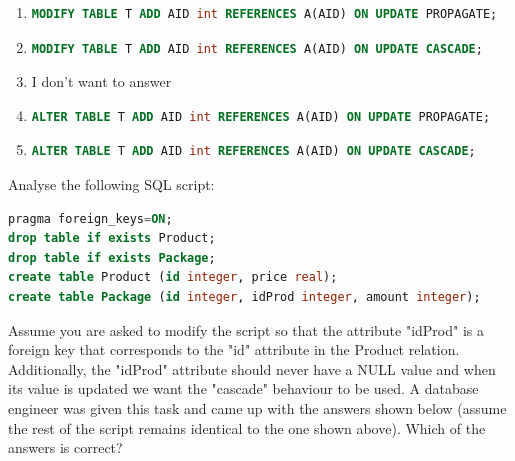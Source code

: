 \documentclass{bdad}
\begin{document}
\begin{enumerate}
    \item
    \begin{lstlisting}[language=SQL, numbers=none, frame=none, belowskip=0pt]
MODIFY TABLE T ADD AID int REFERENCES A(AID) ON UPDATE PROPAGATE;
    \end{lstlisting}

    \item
    \begin{lstlisting}[language=SQL, numbers=none, frame=none, belowskip=0pt]
MODIFY TABLE T ADD AID int REFERENCES A(AID) ON UPDATE CASCADE;
    \end{lstlisting}

    \item I don't want to answer

    \item
    \begin{lstlisting}[language=SQL, numbers=none, frame=none, belowskip=0pt]
ALTER TABLE T ADD AID int REFERENCES A(AID) ON UPDATE PROPAGATE;
    \end{lstlisting}

    \item
    \begin{lstlisting}[language=SQL, numbers=none, frame=none, belowskip=0pt]
ALTER TABLE T ADD AID int REFERENCES A(AID) ON UPDATE CASCADE;
    \end{lstlisting}
\end{enumerate}

Analyse the following SQL script:

\begin{lstlisting}[language=SQL]
pragma foreign_keys=ON;
drop table if exists Product;
drop table if exists Package;
create table Product (id integer, price real);
create table Package (id integer, idProd integer, amount integer);
\end{lstlisting}

Assume you are asked to modify the script so that the attribute "idProd" is a foreign key that corresponds to the "id" attribute in the Product relation. Additionally, the "idProd" attribute should never have a NULL value and when its value is updated we want the "cascade" behaviour to be used. A database engineer was given this task and came up with the answers shown below (assume the rest of the script remains identical to the one shown above). Which of the answers is correct?
\end{document}
